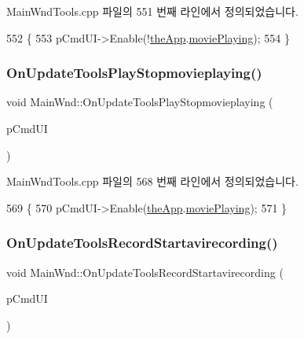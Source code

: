 Main\+Wnd\+Tools.\+cpp 파일의 551 번째 라인에서 정의되었습니다.


\begin{DoxyCode}
552 \{
553   pCmdUI->Enable(!\mbox{\hyperlink{_v_b_a_8cpp_a8095a9d06b37a7efe3723f3218ad8fb3}{theApp}}.\mbox{\hyperlink{class_v_b_a_ac490c27ebc24ea8fbccf42e2909d04ed}{moviePlaying}});
554 \}
\end{DoxyCode}
\mbox{\label{class_main_wnd_ab8effcda4b05e28ae51729df11115cae}} 
\subsubsection{\texorpdfstring{On\+Update\+Tools\+Play\+Stopmovieplaying()}{OnUpdateToolsPlayStopmovieplaying()}}
{\footnotesize\ttfamily void Main\+Wnd\+::\+On\+Update\+Tools\+Play\+Stopmovieplaying (\begin{DoxyParamCaption}\item[{C\+Cmd\+UI $\ast$}]{p\+Cmd\+UI }\end{DoxyParamCaption})\hspace{0.3cm}{\ttfamily [protected]}}



Main\+Wnd\+Tools.\+cpp 파일의 568 번째 라인에서 정의되었습니다.


\begin{DoxyCode}
569 \{
570   pCmdUI->Enable(\mbox{\hyperlink{_v_b_a_8cpp_a8095a9d06b37a7efe3723f3218ad8fb3}{theApp}}.\mbox{\hyperlink{class_v_b_a_ac490c27ebc24ea8fbccf42e2909d04ed}{moviePlaying}});
571 \}
\end{DoxyCode}
\mbox{\label{class_main_wnd_a56e8845d8092224b874101a2deb947b9}} 
\subsubsection{\texorpdfstring{On\+Update\+Tools\+Record\+Startavirecording()}{OnUpdateToolsRecordStartavirecording()}}
{\footnotesize\ttfamily void Main\+Wnd\+::\+On\+Update\+Tools\+Record\+Startavirecording (\begin{DoxyParamCaption}\item[{C\+Cmd\+UI $\ast$}]{p\+Cmd\+UI }\end{DoxyParamCaption})\hspace{0.3cm}{\ttfamily [protected]}}



